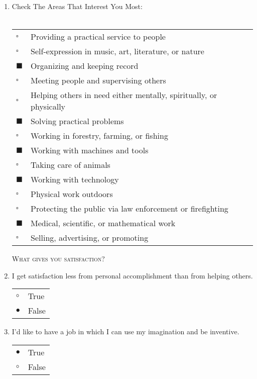 \documentclass{article}
\begin{document}
\begin{enumerate}
\item Check The Areas That Interest You Most:\\\\
\vspace{5pt}
\vspace{5pt}
\begin{tabular}{l l}
    $\square$ & Providing a practical service to people\\
    $\square$  & Self-expression in music, art, literature, or nature\\
    $\blacksquare$ & Organizing and keeping record\\
    $\square$ & Meeting people and supervising others\\
    $\square$ & Helping others in need either mentally, spiritually, or physically\\
    $\blacksquare$ & Solving practical problems\\
    $\square$ & Working in forestry, farming, or fishing\\
    $\blacksquare$ & Working with machines and tools\\
    $\square$ & Taking care of animals\\
    $\blacksquare$ & Working with technology\\
    $\square$ & Physical work outdoors\\
    $\square$ & Protecting the public via law enforcement or firefighting\\
    $\blacksquare$ & Medical, scientific, or mathematical work\\
    $\square$ & Selling, advertising, or promoting\\
    
\end{tabular}

\textsc{What gives you satisfaction?}

\item I get satisfaction less from personal accomplishment than from helping others.\\
\begin{tabular}{l l}
     $\circ$ & True\\
     $\bullet$ & False\\ 
\end{tabular}

\item I’d like to have a job in which I can use my imagination and be inventive.\\
\begin{tabular}{l l}
     $\bullet$ & True\\
     $\circ$ & False\\ 
\end{tabular}


\end{enumerate}
\end{document}
